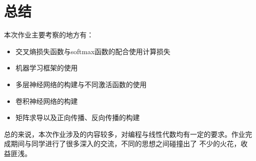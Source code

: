 \documentclass{article}
\begin{document}
\section{总结}
本次作业主要考察的地方有：
\begin{itemize}
    \item 交叉熵损失函数与softmax函数的配合使用计算损失
    \item 机器学习框架的使用
    \item 多层神经网络的构建与不同激活函数的使用
    \item 卷积神经网络的构建
    \item 矩阵求导以及正向传播、反向传播的构建
\end{itemize}
总的来说，本次作业涉及的内容较多，对编程与线性代数均有一定的要求。作业完成期间与同学进行了很多深入的交流，不同的思想之间碰撞出了
不少的火花，收益匪浅。
\end{document}

